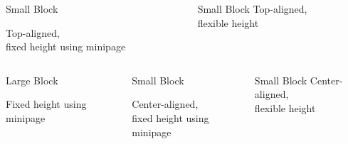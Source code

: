 \documentclass[t]{beamer}
\begin{document}
\begin{frame}{}
\begin{columns}
\begin{column}{0.25\textwidth}
        \begin{block}{Small Block}
          \begin{minipage}[t][8em][t]{\textwidth}
            Top-aligned,\\
            fixed height using minipage
          \end{minipage}
        \end{block}

      \end{column}
      \begin{column}{0.25\textwidth}

        \begin{block}{Small Block}
          Top-aligned,\\
          flexible height
        \end{block}

      \end{column}
    \end{columns}

    \begin{columns}[c]
      \begin{column}{0.5\textwidth}

        \begin{block}{Large Block}
          \begin{minipage}[t][8em][t]{\textwidth}
            Fixed height using minipage
          \end{minipage}
        \end{block}

      \end{column}
      \begin{column}{0.25\textwidth}

        \begin{block}{Small Block}
          \begin{minipage}[t][8em][t]{\textwidth}
            Center-aligned,\\
            fixed height using minipage
          \end{minipage}
        \end{block}

      \end{column}
      \begin{column}{0.25\textwidth}

        \begin{block}{Small Block}
          Center-aligned,\\
          flexible height
        \end{block}


\end{column}
\end{columns}
\end{frame}
\end{document}
